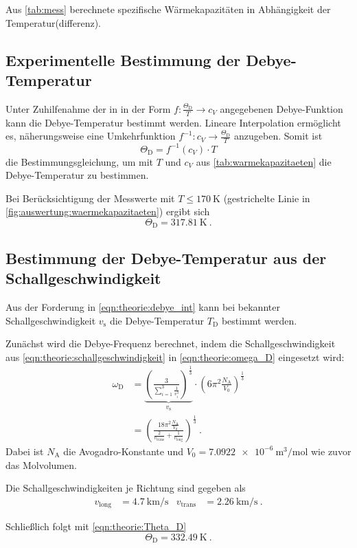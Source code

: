 \begin{table}
    \centering
    \caption{Aus \autoref{tab:mess} berechnete spezifische Wärmekapazitäten in Abhängigkeit der Temperatur(differenz).}
    \label{tab:warmekapazitaeten}
\end{table}


\subsection{Experimentelle Bestimmung der Debye-Temperatur}
\label{sec:auswertung:debye_exp}
Unter Zuhilfenahme der in \cite[Tabelle 1]{versuchsanleitung}
in der Form $f: \frac{\Theta_\text{D}}{T} \longrightarrow c_V$
angegebenen Debye-Funktion
kann die Debye-Temperatur bestimmt werden.
Lineare Interpolation ermöglicht es, näherungsweise eine Umkehrfunktion
$f^{-1}: c_V \longrightarrow \frac{\Theta_\text{D}}{T}$
anzugeben.
Somit ist
\[
    \Theta_\text{D} = f^{-1}(c_V) · T
\]
die Bestimmungsgleichung, um mit $T$ und $c_V$ aus \autoref{tab:warmekapazitaeten} die Debye-Temperatur zu bestimmen.

Bei Berücksichtigung der Messwerte mit $T \leq \SI{170}{\kelvin}$ (gestrichelte Linie in \autoref{fig:auswertung:waermekapazitaeten})
ergibt sich
\[
    \Theta_\text{D} = \SI{317.81}{\kelvin} \ .
\]


\subsection{Bestimmung der Debye-Temperatur aus der Schallgeschwindigkeit}
\label{sec:auswertung:debye_vs}
Aus der Forderung in \autoref{eqn:theorie:debye_int}
kann bei bekannter Schallgeschwindigkeit $v_\text{s}$ die Debye-Temperatur $T_\text{D}$ bestimmt werden.

Zunächst wird die Debye-Frequenz berechnet,
indem die Schallgeschwindigkeit aus \autoref{eqn:theorie:schallgeschwindigkeit}
in \autoref{eqn:theorie:omega_D} eingesetzt wird:
\begin{align*}
    \omega_\text{D} &= \underbrace{\left( \frac{3}{\sum_{i=1}^3 \frac{1}{v^3_i}} \right)^\frac{1}{3}}_{v_\text{s}}
    \cdot \left(6 \pi^2 \frac{N_\text{A}}{V_0}\right)^{\frac{1}{3}}
    \\
    &= \left( \frac{18 \pi^2 \frac{N_\text{A}}{V_0}}{\frac{2}{v_\text{trans}} + \frac{1}{v_\text{long}}} \right)^\frac{1}{3} \ .
\end{align*}
Dabei ist $N_\text{A}$ die Avogadro-Konstante und $V_0 = \SI{7.0922e-6}{\cubic\meter\per\mol}$ \cite{periodictable} wie zuvor das Molvolumen.

Die Schallgeschwindigkeiten je Richtung sind gegeben \cite{versuchsanleitung} als
\begin{align*}
    v_\text{long} &= \SI{4.7}{\kilo\meter\per\second}
    &
    v_\text{trans} &= \SI{2.26}{\kilo\meter\per\second} \ .
\end{align*}

Schließlich folgt mit \autoref{eqn:theorie:Theta_D}
\[
    \Theta_\text{D} = \SI{332.49}{\kelvin} \ .
\]
